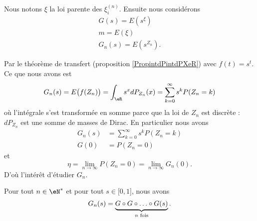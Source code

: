 Nous notons \( \xi\) la loi parente des \( \xi_i^{(n)}\). Ensuite nous considérons 
\begin{subequations}
    \begin{align}
        G(s)=E(s^{\xi})\\
        m=E(\xi)\\
        G_n(s)=E(s^{Z_n}).
    \end{align}
\end{subequations}

    Par le théorème de transfert (proposition \ref{PropintdPintdPXeR}) avec \( f(t)=s^t\). Ce que nous avons est
    \begin{equation}        \label{EqNRtXdC}
        G_n(s)=E\big( f(Z_n) \big)=\int_{\eR}s^xdP_{Z_n}(x)=\sum_{k=0}^{\infty}s^kP(Z_n=k)
    \end{equation}
    où l'intégrale s'est transformée en somme parce que la loi de \( Z_n\) est discrète : \( dP_{Z_n}\) est une somme de masses de Dirac. En particulier nous avons
    \begin{subequations}
        \begin{align}
            G_n(s)&=\sum_{k=0}^{\infty}s^kP(Z_n=k)\\
            G(0)&=P(Z_n=0)
        \end{align}
    \end{subequations}
    et
    \begin{equation}
        \eta=\lim_{n\to \infty} P(Z_n=0)=\lim_{n\to \infty} G_n(0).
    \end{equation}
    D'où l'intérêt d'étudier \( G_n\).

\begin{lemma}       \label{LemezrOiI}
    Pour tout \( n\in \eN^*\) et pour tout \( s\in\mathopen[ 0 , 1 \mathclose]\), nous avons
    \begin{equation}
        G_n(s)=\underbrace{G\circ G\circ\ldots\circ G(s)}_{\text{\( n\) fois}}.
    \end{equation}
\end{lemma}

